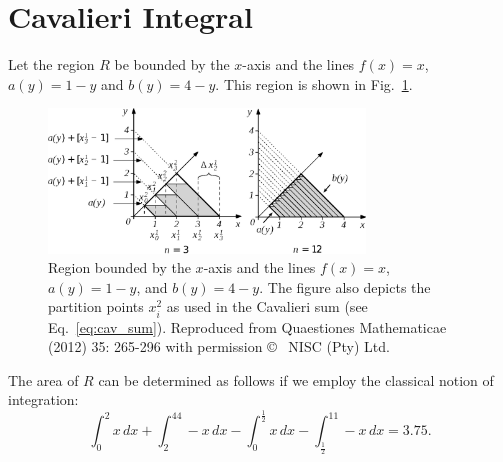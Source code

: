 \documentclass{article}
\theoremstyle{theorem}
\theoremstyle{definition}
\begin{document}
\section{Cavalieri Integral}
Let the region $R$ be bounded by the $x$-axis and the lines $f(x)=x$, $a(y)=1-y$ and $b(y)=4-y$. This region is shown in Fig.~\ref{fig:caval2}.\\
\begin{figure}[htb]
\centering
\includegraphics[width=0.75\textwidth]{fig13.eps}
\caption{Region bounded by the $x$-axis and the lines $f(x)=x$, $a(y)=1-y$, and $b(y)=4-y$. The figure also depicts the partition points $x_i^2$ as used in the Cavalieri sum (see Eq.~\ref{eq:cav_sum}). Reproduced from Quaestiones Mathematicae (2012) 35: 265-296 with permission \copyright~ NISC (Pty) Ltd.}
\label{fig:caval2}
\end{figure}

\noindent
The area of $R$ can be determined as follows if we employ the classical notion of integration:
\begin{equation}
\int_0^2x\, dx+\int_2^44-x\, dx- \int_0^{\frac{1}{2}}x\, dx-\int_{\frac{1}{2}}^11-x\, dx = 3.75. 
\end{equation}
\end{document}
